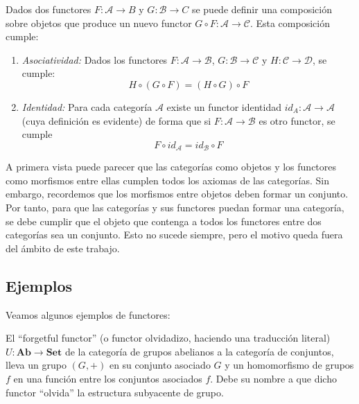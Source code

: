 \begin{observacion}
    Dados dos functores $F: \mathscr{A} \longrightarrow {B}$ y $G: \mathscr{B} \longrightarrow {C}$ se puede definir una composición sobre objetos que produce un nuevo functor $G \circ F: \mathscr{A} \longrightarrow \mathscr{C}$. Esta composición cumple:

    \begin{enumerate}
        \item \textit{Asociatividad: } Dados los functores $F: \mathscr{A} \longrightarrow \mathscr{B}$, $G: \mathscr{B} \longrightarrow \mathscr{C}$ y $H: \mathscr{C} \longrightarrow \mathscr{D}$, se cumple: \begin{equation}
            H \circ (G \circ F) = (H \circ G) \circ F   
        \end{equation}
        \item \textit{Identidad: } Para cada categoría $\mathscr{A}$ existe un functor identidad $id_A: \mathscr{A} \longrightarrow \mathscr{A}$ (cuya definición es evidente) de forma que si $F: \mathscr{A} \longrightarrow \mathscr{B}$ es otro functor, se cumple \begin{equation}
            F \circ id_{\mathscr{A}} = id_{\mathscr{B}} \circ F 
        \end{equation} 
    \end{enumerate}
\end{observacion}

A primera vista puede parecer que las categorías como objetos y los functores como morfismos entre ellas cumplen todos los axiomas de las categorías.  Sin embargo, recordemos que los morfismos entre objetos deben formar un conjunto. Por tanto, para que las categorías y sus functores puedan formar una categoría, se debe cumplir que el objeto que contenga a todos los functores entre dos categorías sea un conjunto. Esto no sucede siempre, pero el motivo queda fuera del ámbito de este trabajo.

\subsection{Ejemplos}
Veamos algunos ejemplos de functores:

\begin{ejemplo}
    El ``forgetful functor'' (o functor olvidadizo, haciendo una traducción literal) $U: \textbf{Ab} \longrightarrow \textbf{Set} $ de la categoría de grupos abelianos a la categoría de conjuntos, lleva un grupo $(G,+)$ en su conjunto asociado $G$ y un homomorfismo de grupos $f$ en una función entre los conjuntos asociados $f$. Debe su nombre a que dicho functor ``olvida'' la estructura subyacente de grupo.
\end{ejemplo}

